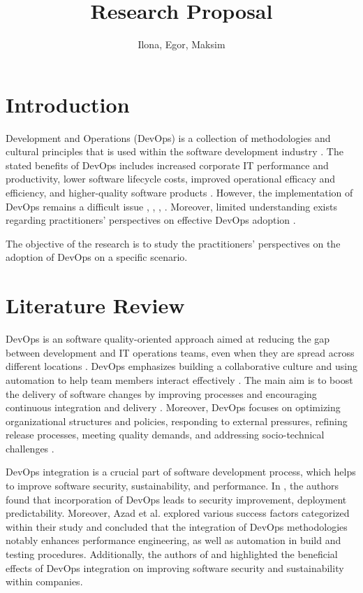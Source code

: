 \documentclass[oneside,final,12pt,a4paper]{extreport}
\title{Research Proposal}
\author{Ilona, Egor, Maksim}
\affil{Innopolis University}
\begin{document}
\maketitle

\newpage


\section{Introduction}

Development and Operations (DevOps) is a collection of methodologies and cultural principles that is used within the software development industry \cite{int1}. The stated benefits of DevOps includes increased corporate IT performance and productivity, lower software lifecycle costs, improved operational efficacy and efficiency, and higher-quality software products \cite{int1}. However, the implementation of DevOps remains a difficult issue \cite{int2}, \cite{8}, \cite{20}, \cite{14}. Moreover, limited understanding exists regarding practitioners' perspectives on effective DevOps adoption \cite{10}.

The objective of the research is to study the practitioners' perspectives on the adoption of DevOps on a specific scenario.

\section{Literature Review}

DevOps is an software quality-oriented approach aimed at reducing the gap between development and IT operations teams, even when they are spread across different locations \cite{17}. DevOps emphasizes building a collaborative culture and using automation to help team members interact effectively \cite{7}. The main aim is to boost the delivery of software changes by improving processes and encouraging continuous integration and delivery \cite{11}. Moreover, DevOps focuses on optimizing organizational structures and policies, responding to external pressures, refining release processes, meeting quality demands, and addressing socio-technical challenges \cite{7}.

DevOps integration is a crucial part of software development process, which helps to improve software security, sustainability, and performance. In \cite{7}, the authors found that incorporation of DevOps leads to security improvement, deployment predictability. Moreover, Azad et al. \cite{9} explored various success factors categorized within their study and concluded that the integration of DevOps methodologies notably enhances performance engineering, as well as automation in build and testing procedures. Additionally, the authors of \cite{12} and \cite{18} highlighted the beneficial effects of DevOps integration on improving software security and sustainability within companies. 
\end{document}
